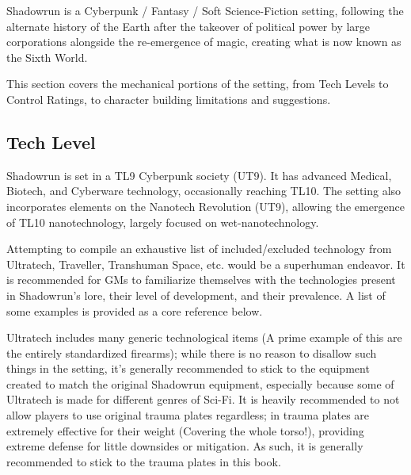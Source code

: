 
\begin{multicols}{3}
	
	Shadowrun is a Cyberpunk / Fantasy / Soft Science-Fiction setting, following the alternate history of the Earth after the takeover of political power by large corporations alongside the re-emergence of magic, creating what is now known as the Sixth World.
	
	This section covers the mechanical portions of the setting, from Tech Levels to Control Ratings, to character building limitations and suggestions.
	
	\subsection{Tech Level}\label{TL}
	
	Shadowrun is set in a TL9 Cyberpunk society (UT9). It has advanced Medical, Biotech, and Cyberware technology, occasionally reaching TL10. The setting also incorporates elements on the Nanotech Revolution (UT9), allowing the emergence of TL10 nanotechnology, largely focused on wet-nanotechnology.
	
	Attempting to compile an exhaustive list of included/excluded technology from Ultratech, Traveller, Transhuman Space, etc. would be a superhuman endeavor. It is recommended for GMs to familiarize themselves with the technologies present in Shadowrun's lore, their level of development, and their prevalence. A list of some examples is provided as a core reference below.
	
	\GURPS Ultratech includes many generic technological items (A prime example of this are the entirely standardized firearms); while there is no reason to disallow such things in the setting, it's generally recommended to stick to the equipment created to match the original Shadowrun equipment, especially because some of Ultratech is made for different genres of Sci-Fi. It is heavily recommended to not allow players to use \GURPS original trauma plates regardless; in \GURPS trauma plates are extremely effective for their weight (Covering the whole torso!), providing extreme defense for little downsides or mitigation. As such, it is generally recommended to stick to the trauma plates in this book.
	

\end{multicols}
